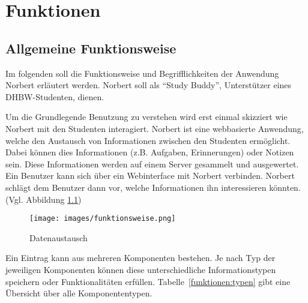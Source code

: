 \chapter{Funktionen}

\section{Allgemeine Funktionsweise}

Im folgenden soll die Funktionsweise und Begrifflichkeiten der Anwendung Norbert erläutert werden.
Norbert soll als \enquote{Study Buddy}, Unterstützer eines DHBW-Studenten, dienen.

Um die Grundlegende Benutzung zu verstehen wird erst einmal skizziert wie Norbert mit den Studenten interagiert.
Norbert ist eine webbasierte Anwendung, welche den Austausch von Informationen zwischen den Studenten ermöglicht.
Dabei können dies Informationen (z.B. Aufgaben, Erinnerungen) oder Notizen sein.
Diese Informationen werden auf einem Server gesammelt und ausgewertet.
Ein Benutzer kann sich über ein Webinterface mit Norbert verbinden.
Norbert schlägt dem Benutzer dann vor, welche Informationen ihn interessieren könnten. (Vgl. Abbildung \ref{funktionen:datenaustausch})

\begin{figure}[H]
    \centering
    \texttt{[image: images/funktionsweise.png]}
    \caption{Datenaustausch}
    \label{funktionen:datenaustausch}
\end{figure}

Ein Eintrag kann aus mehreren Komponenten bestehen. Je nach Typ der jeweiligen Komponenten können diese unterschiedliche Informationstypen speichern oder Funktionalitäten erfüllen. Tabelle~\ref{funktionen:typen} gibt eine Übersicht über alle Komponententypen.

